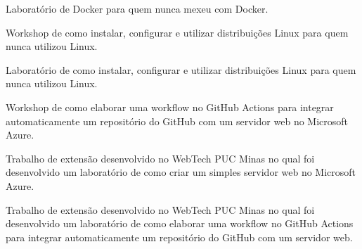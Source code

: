 \documentclass[10pt,a4paper,ragged2e,withhyper]{altacv}
\begin{document}
\begin{paracol}{2}
            Laboratório de Docker para quem nunca mexeu com Docker.\\
            \divider

            Workshop de como instalar, configurar e utilizar distribuições Linux para quem nunca utilizou Linux.\\
            \divider

            Laboratório de como instalar, configurar e utilizar distribuições Linux para quem nunca utilizou Linux.\\
            \divider

            Workshop de como elaborar uma workflow no GitHub Actions para integrar automaticamente um repositório do GitHub com um servidor web no Microsoft Azure.\\
            \divider
        
            Trabalho de extensão desenvolvido no WebTech PUC Minas no qual foi desenvolvido um laboratório de como criar um simples servidor web no Microsoft Azure.\\
            \divider
        
            Trabalho de extensão desenvolvido no WebTech PUC Minas no qual foi desenvolvido um laboratório de como elaborar uma workflow no GitHub Actions para integrar automaticamente um repositório do GitHub com um servidor web.\\
            \divider


\end{paracol}
\end{document}
